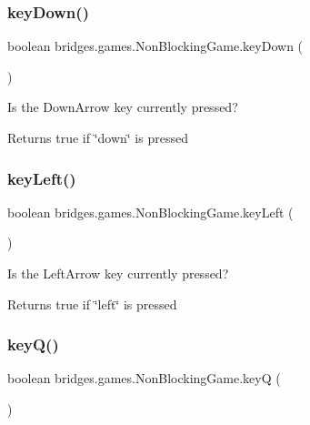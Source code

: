 \subsubsection{\texorpdfstring{keyDown()}{keyDown()}}
{\footnotesize\ttfamily boolean bridges.\+games.\+Non\+Blocking\+Game.\+key\+Down (\begin{DoxyParamCaption}{ }\end{DoxyParamCaption})\hspace{0.3cm}{\ttfamily [protected]}}



Is the Down\+Arrow key currently pressed? 

\begin{DoxyReturn}{Returns}
true if \char`\"{}down\char`\"{} is pressed 
\end{DoxyReturn}
\mbox{\label{classbridges_1_1games_1_1_non_blocking_game_ac8b9a6d6d4074105af6d28995091bd2b}} 
\subsubsection{\texorpdfstring{keyLeft()}{keyLeft()}}
{\footnotesize\ttfamily boolean bridges.\+games.\+Non\+Blocking\+Game.\+key\+Left (\begin{DoxyParamCaption}{ }\end{DoxyParamCaption})\hspace{0.3cm}{\ttfamily [protected]}}



Is the Left\+Arrow key currently pressed? 

\begin{DoxyReturn}{Returns}
true if \char`\"{}left\char`\"{} is pressed 
\end{DoxyReturn}
\mbox{\label{classbridges_1_1games_1_1_non_blocking_game_a4075b3185f2fe0d20c9ed9957c448aee}} 
\subsubsection{\texorpdfstring{keyQ()}{keyQ()}}
{\footnotesize\ttfamily boolean bridges.\+games.\+Non\+Blocking\+Game.\+keyQ (\begin{DoxyParamCaption}{ }\end{DoxyParamCaption})\hspace{0.3cm}{\ttfamily [protected]}}



